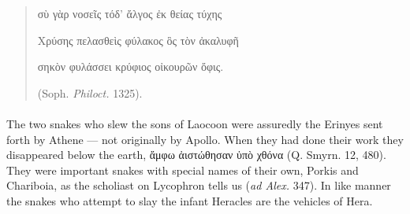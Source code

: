 \documentclass[a4paper, 11pt, oneside, polutonikogreek, english]{article}
\begin{document}
\begin{quotation}
\large
σὺ γὰρ νοσεῖς τόδ' ἄλγος ἐκ θείας τύχης

Χρύσης πελασθεὶς φύλακος ὃς τὸν ἀκαλυφῆ

σηκὸν φυλάσσει κρύφιος οἰκουρῶν ὄφις.

(Soph. \emph{Philoct.} 1325).
\end{quotation}
\paragraph{}
The two snakes who slew the sons of Laocoon were assuredly the Erinyes sent forth by Athene --- not originally by Apollo. When they had done their work they disappeared below the earth, ἄμφω ἀιστώθησαν ὑπὸ χθόνα (Q. Smyrn. 12, 480). They were important snakes with special names of their own, Porkis and Chariboia, as the scholiast on Lycophron tells us (\emph{ad Alex.} 347). In like manner the snakes who attempt to slay the infant Heracles are the vehicles of Hera.
\end{document}
